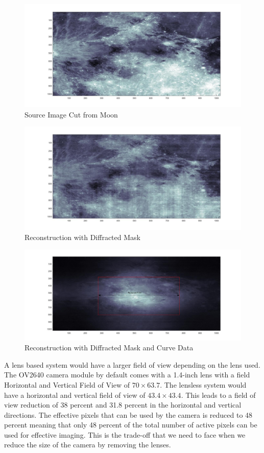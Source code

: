 \begin{figure}[]
\centering
\includegraphics[width = 0.50\linewidth]{pics/OriginalImage.jpg}
\caption{Source Image Cut from Moon}
\label{fig:Orig}
\end{figure}

\begin{figure}[]
\centering
\includegraphics[width = 0.50\linewidth]{pics/OriginalImageDiffRec.jpg}
\caption{Reconstruction with Diffracted Mask}
\label{fig:Rec_Diff}
\end{figure}

\begin{figure}[]
\centering
\includegraphics[width = 0.50\linewidth]{pics/ImageRecWithAcc.jpg}
\caption{Reconstruction with Diffracted Mask and Curve Data}
\label{fig:Rec_Acc}
\end{figure}
A lens based system would have a larger field of view depending on the lens used. The OV2640 camera module by default comes with a 1.4-inch lens with a field Horizontal and Vertical Field of View of $70 \times 63.7$\cite{OV2640Arducam}\cite{lenses}. The lensless system would have a horizontal and vertical field of view of $43.4 \times 43.4$. This leads to a field of view reduction of 38 percent and 31.8 percent in the horizontal and vertical directions. The effective pixels that can be used by the camera is reduced to 48 percent meaning that only 48 percent of the total number of active pixels can be used for effective imaging. This is the trade-off that we need to face when we reduce the size of the camera by removing the lenses.

